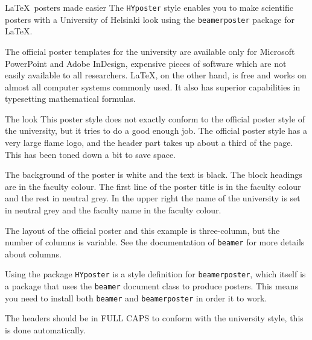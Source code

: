 \documentclass[final]{beamer}
\author[Wilkman]{Olli Wilkman,\\ Someone Else\\ and Someone Yet Different}
\date{\today}
\begin{document}
\begin{frame}[t, fragile]
\begin{columns}[T]
	
\begin{column}{0.32\linewidth}


\begin{block}{\LaTeX~posters made easier}
The \texttt{HYposter} style enables you to make scientific posters with a University of Helsinki look using  the \texttt{beamerposter} package for \LaTeX. 

The official poster templates for the university are available only for Microsoft PowerPoint and Adobe InDesign, expensive pieces of software which are not easily available to all researchers. \LaTeX, on the other hand, is free and works on almost all computer systems commonly used. It also has superior capabilities in typesetting mathematical formulas.
\end{block}


\begin{block}{The look}
This poster style does not exactly conform to the official poster style of the university, but it tries to do a good enough job. The official poster style has a very large flame logo, and the header part takes up about a third of the page. This has been toned down a bit to save space.

The background of the poster is white and the text is black. The block headings are in the faculty colour. The first line of the poster title is in the faculty colour and the rest in neutral grey. In the upper right the name of the university is set in neutral grey and the faculty name in the faculty colour.

The layout of the official poster and this example is three-column, but the number of columns is variable. See the documentation of \texttt{beamer} for more details about columns.
\end{block}


\begin{block}{Using the package}
\texttt{HYposter} is a style definition for \texttt{beamerposter}, which itself is a package that uses the \texttt{beamer} document class to produce posters. This means you need to install both \texttt{beamer} and \texttt{beamerposter} in order it to work.

The headers should be in FULL CAPS to conform with the university style, this is done automatically.
\end{block}


\end{column}
\end{columns}
\end{frame}
\end{document}
